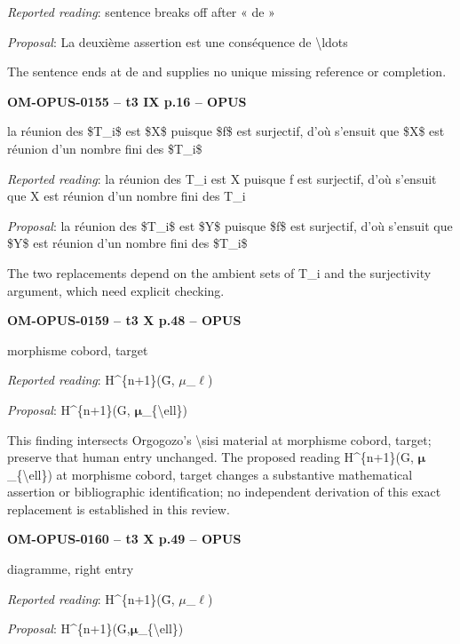 \emph{Reported reading}: sentence breaks off after « de »\par
\emph{Proposal}: La deuxième assertion est une conséquence de \textbackslash{}ldots\par
The sentence ends at de and supplies no unique missing reference or completion.\par
\par\noindent\textbf{OM-OPUS-0155 -- t3 IX p.16 -- OPUS}\par
la réunion des \$T\_i\$ est \$X\$ puisque \$f\$ est surjectif, d'où s'ensuit que \$X\$ est réunion d'un nombre fini des \$T\_i\$\par
\emph{Reported reading}: la réunion des T\_i est X puisque f est surjectif, d'où s'ensuit que X est réunion d'un nombre fini des T\_i\par
\emph{Proposal}: la réunion des \$T\_i\$ est \$Y\$ puisque \$f\$ est surjectif, d'où s'ensuit que \$Y\$ est réunion d'un nombre fini des \$T\_i\$\par
The two replacements depend on the ambient sets of T\_i and the surjectivity argument, which need explicit checking.\par
\par\noindent\textbf{OM-OPUS-0159 -- t3 X p.48 -- OPUS}\par
morphisme cobord, target\par
\emph{Reported reading}: H\textasciicircum{}\{n+1\}(Ḡ, \ensuremath{\mu}\_\ensuremath{\ell})\par
\emph{Proposal}: H\textasciicircum{}\{n+1\}(G, \ensuremath{𝛍}\_\{\textbackslash{}ell\})\par
This finding intersects Orgogozo's \textbackslash{}sisi material at morphisme cobord, target; preserve that human entry unchanged. The proposed reading H\textasciicircum{}\{n+1\}(G, \ensuremath{𝛍}\_\{\textbackslash{}ell\}) at morphisme cobord, target changes a substantive mathematical assertion or bibliographic identification; no independent derivation of this exact replacement is established in this review.\par
\par\noindent\textbf{OM-OPUS-0160 -- t3 X p.49 -- OPUS}\par
diagramme, right entry\par
\emph{Reported reading}: H\textasciicircum{}\{n+1\}(Ḡ, \ensuremath{\mu}\_\ensuremath{\ell})\par
\emph{Proposal}: H\textasciicircum{}\{n+1\}(G,\ensuremath{𝛍}\_\{\textbackslash{}ell\})\par
